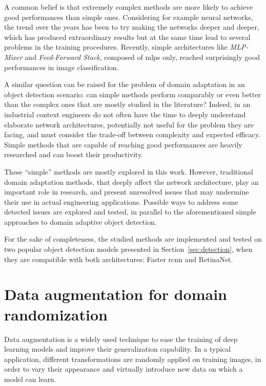 \documentclass[%
    corpo=12pt,
    twoside,
    stile=classica,   
    tipotesi=magistrale,
    evenboxes,
    english,
	numerazioneromana,
]{toptesi}
\newcommand{\quotes}[1]{``#1''}
\begin{document}
\bigskip
A common belief is that extremely complex methods are more likely to achieve good performances than simple ones. Considering for example neural networks, the trend over the years has been to try making the networks deeper and deeper, which has produced extraordinary results but at the same time lead to several problems in the training procedures. Recently, simple architectures like \textit{MLP-Mixer}\cite{tolstikhin2021mlpmixer} and \textit{Feed-Forward Stack}\cite{melaskyriazi2021need}, composed of \glspl{mlp} only, reached surprisingly good performances in image classification.

A similar question can be raised for the problem of domain adaptation in an object detection scenario: can simple methods perform comparably or even better than the complex ones that are mostly studied in the literature? Indeed, in an industrial context engineers do not often have the time to deeply understand elaborate network architectures, potentially not useful for the problem they are facing, and must consider the trade-off between complexity and expected efficacy. Simple methods that are capable of reaching good performances are heavily researched and can boost their productivity.

\bigskip
These \quotes{simple} methods are mostly explored in this work. However, traditional domain adaptation methods, that deeply affect the network architecture, play an important role in research, and present unresolved issues that may undermine their use in actual engineering applications. Possible ways to address some detected issues are explored and tested, in parallel to the aforementioned simple approaches to domain adaptive object detection.

\bigskip
For the sake of completeness, the studied methods are implemented and tested on two popular object detection models presented in Section~\ref{sec:detection}, when they are compatible with both architectures: Faster \gls{rcnn} and RetinaNet.

\section{Data augmentation for domain randomization}\label{sec:dataaug}
Data augmentation is a widely used technique to ease the training of deep learning models and improve their generalization capability. In a typical application, different transformations are randomly applied on training images, in order to vary their appearance and virtually introduce new data on which a model can learn.
\end{document}
